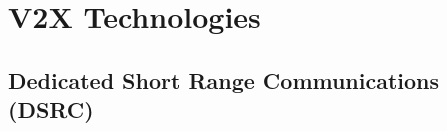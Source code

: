 % 






\section{V2X Technologies}
\label{sec:v2xtech}



\subsection{Dedicated Short Range Communications (DSRC)}


